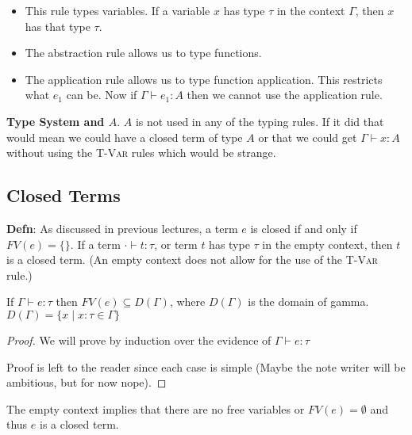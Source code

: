 \documentclass{lecturenotes}
\newenvironment{theorem}[2][Theorem]{\begin{trivlist}
\item[\hskip \labelsep {\bfseries #1}\hskip \labelsep {\bfseries #2.}]}{\end{trivlist}}
\newenvironment{corollary}[2][Corollary]{\begin{trivlist}
\item[\hskip \labelsep {\bfseries #1}\hskip \labelsep {\bfseries #2.}]}{\end{trivlist}}
\begin{document}
\begin{itemize}
    \item[\textsc{T-Var}] This rule types variables. If a variable $x$ has type $\tau$ in the context $\Gamma$, then $x$ has that type $\tau$.  
    
    \item[\textsc{T-Abs}] The abstraction rule allows us to type functions. 
    
    \item[\textsc{T-App}] The application rule allows us to type function application. 
      This restricts what $e_1$ can be. 
      Now if $\Gamma \vdash e_1 : A$ then we cannot use the application rule.  
\end{itemize}

\textbf{Type System and $A$}. $A$ is not used in any of the typing rules. 
  If it did that would mean we could have a closed term of type $A$ or that we could get $\Gamma \vdash x : A$ without using the \textsc{T-Var} rules which would be strange. 

\subsection{Closed Terms}

\textbf{Defn}: As discussed in previous lectures, a term $e$ is closed if and only if $FV(e) = \{\}$. 
  If a term $\cdot \vdash t : \tau$, or term $t$ has type $\tau$ in the empty context, then $t$ is a closed term. (An empty context does not allow for the use of the \textsc{T-Var} rule.)

\begin{theorem}{FV Domain}
  If $\Gamma \vdash e : \tau$ then $FV(e) \subseteq D(\Gamma)$, where $D(\Gamma)$ is the domain of gamma.  $D(\Gamma) = \{x \mid x : \tau \in\Gamma\}$
\end{theorem}

\begin{proof}
  We will prove by induction over the evidence of $\Gamma \vdash e : \tau$   
  
  Proof is left to the reader since each case is simple (Maybe the note writer will be ambitious, but for now nope).
\end{proof}


\begin{corollary}{FV of emtpy context}
  The empty context implies that there are no free variables or $FV(e) = \emptyset$ and thus $e$ is a closed term.     
\end{corollary}
\end{document}

